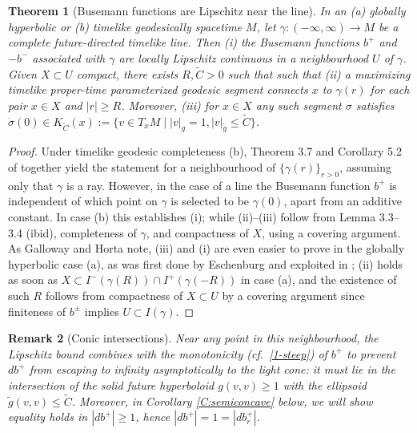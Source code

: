 \documentclass[12pt]{amsart}
\newtheorem{theorem}{Theorem}
\newtheorem{remark}[theorem]{Remark}
\begin{document}
\begin{theorem}[Busemann functions are Lipschitz near the line]\label{T:Lipschitz}
In an (a) globally hyperbolic or (b) timelike geodesically spacetime $M$, let $\gamma: 
(-\infty,\infty) \longrightarrow M$ be a complete future-directed timelike line.
Then (i) the Busemann functions $b^+$ and $-b^-$ associated with $\gamma$ are locally Lipschitz continuous in a neighbourhood $U$ of $\gamma$. 
Given $X \subset U$ compact,  there exists $R,
\tilde C >0$ %
such that  such that (ii) a maximizing timelike proper-time parameterized geodesic segment connects $x$ to $\gamma(r)$ for each pair
$x\in X$ and $|r| \ge R$. Moreover, (iii) for $x \in X$ any such segment $\sigma$ satisfies
$\dot \sigma(0) \in K_{\tilde C}(x) := \{v \in T_x M \mid |v|_g =1, |v|_{\tilde g} \le \tilde C\}$.
\end{theorem}

\begin{proof}
Under {timelike geodesic completeness} (b),  Theorem 3.7 and Corollary 5.2 of \cite{GallowayHorta96} together yield the statement for a neighbourhood of $\{\gamma(r)\}_{r>0}$, assuming only that $\gamma$ is a ray.
However, in the case of a line the Busemann function $b^+$ is independent of which point on $\gamma$ is selected to be $\gamma(0)$, apart from an additive constant.
In case (b) this establishes (i); while (ii)--(iii) 
follow from Lemma 3.3--3.4 (ibid), completeness of $\gamma$, 
and compactness of $X$, using a covering argument. 
As Galloway and Horta 
note, (iii) and (i) are even easier to prove in {the globally hyperbolic} case (a),
as was first done by Eschenburg \cite[Lemmas 3.2--3.3]{Eschenburg88}
and exploited in \cite{Galloway89}; (ii) holds as soon as
$X \subset I^-(\gamma(R)) \cap I^+(\gamma(-R))$ in case (a),
and the existence of such $R$ follows from 
compactness of $X \subset U$ by a covering argument 
since finiteness of $b^\pm$ implies $U\subset I(\gamma)$.
\end{proof}



\begin{remark}[Conic intersections]\label{R:conic intersections}
Near any point in this neighbourhood,  the Lipschitz bound combines with the monotonicity (cf.~\eqref{1-steep}) of $b^+$ to 
prevent $db^+$ from escaping to infinity asymptotically to the light cone:   it must lie in the intersection of 
the solid future hyperboloid $g(v,v) \ge 1$ with the ellipsoid $\tilde g(v,v) \le \tilde C$.
Moreover, in Corollary \ref{C:semiconcave} below, we will show equality holds in $|db^+| \ge 1$, 
 hence $|db^+|=1=|db^+_r|$.
 \end{remark}
\end{document}
